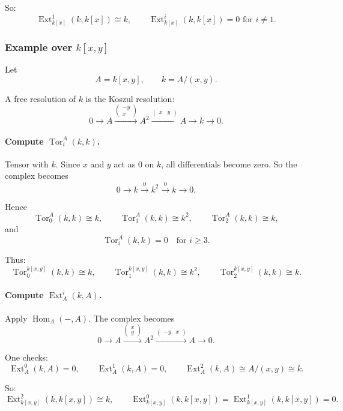 \documentclass[12pt,a4paper]{article}
\theoremstyle{notespace}
\DeclareMathOperator{\Hom}{Hom}
\DeclareMathOperator{\Tor}{Tor}
\DeclareMathOperator{\Ext}{Ext}
\begin{document}
So:
\[
\boxed{
	\Ext_{k[x]}^1(k,k[x])\cong k,
	\qquad
	\Ext_{k[x]}^i(k,k[x])=0 \text{ for } i\neq 1.
}
\]

\subsubsection{Example over \(k[x,y]\)}

Let
\[
A=k[x,y],
\qquad
k=A/(x,y).
\]

A free resolution of \(k\) is the Koszul resolution:
\[
0\longrightarrow A
\xrightarrow{\begin{pmatrix}-y\\x\end{pmatrix}}
A^2
\xrightarrow{\begin{pmatrix}x&y\end{pmatrix}}
A
\longrightarrow k
\longrightarrow 0.
\]

\paragraph{Compute \(\Tor_i^A(k,k)\).}

Tensor with \(k\). Since \(x\) and \(y\) act as \(0\) on \(k\), all differentials become zero. So the complex becomes
\[
0\longrightarrow k \xrightarrow{0} k^2 \xrightarrow{0} k \longrightarrow 0.
\]

Hence
\[
\Tor_0^A(k,k)\cong k,
\qquad
\Tor_1^A(k,k)\cong k^2,
\qquad
\Tor_2^A(k,k)\cong k,
\]
and
\[
\Tor_i^A(k,k)=0 \quad \text{for } i\ge 3.
\]

Thus:
\[
\boxed{
	\Tor_0^{k[x,y]}(k,k)\cong k,\qquad
	\Tor_1^{k[x,y]}(k,k)\cong k^2,\qquad
	\Tor_2^{k[x,y]}(k,k)\cong k.
}
\]

\paragraph{Compute \(\Ext_A^i(k,A)\).}

Apply \(\Hom_A(-,A)\). The complex becomes
\[
0\longrightarrow A
\xrightarrow{\begin{pmatrix}x\\y\end{pmatrix}}
A^2
\xrightarrow{\begin{pmatrix}-y&x\end{pmatrix}}
A
\longrightarrow 0.
\]

One checks:
\[
\Ext_A^0(k,A)=0,
\qquad
\Ext_A^1(k,A)=0,
\qquad
\Ext_A^2(k,A)\cong A/(x,y)\cong k.
\]

So:
\[
\boxed{
	\Ext_{k[x,y]}^2(k,k[x,y])\cong k,
	\qquad
	\Ext_{k[x,y]}^0(k,k[x,y])=\Ext_{k[x,y]}^1(k,k[x,y])=0.
}
\]
\end{document}
